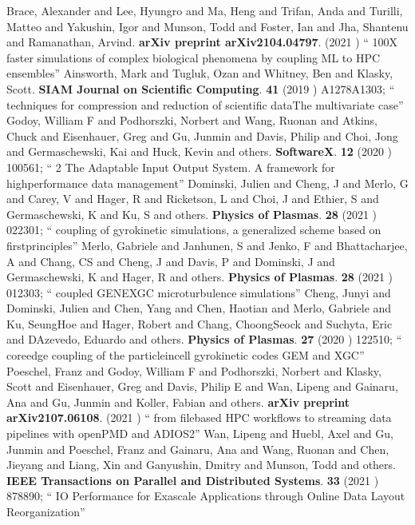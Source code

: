 \documentclass{article}
\begin{document}
\begin{thebibliography}{99}
 Brace, Alexander and Lee, Hyungro and Ma, Heng and Trifan, Anda and Turilli, Matteo and Yakushin, Igor and Munson, Todd and Foster, Ian and Jha, Shantenu and Ramanathan, Arvind. {\bf arXiv preprint arXiv2104.04797}. (2021 ) `` 100X faster simulations of complex biological phenomena by coupling ML to HPC ensembles''
 Ainsworth, Mark and Tugluk, Ozan and Whitney, Ben and Klasky, Scott. {\bf SIAM Journal on Scientific Computing}. {\bf 41} (2019 ) A1278A1303; `` techniques for compression and reduction of scientific dataThe multivariate case''
 Godoy, William F and Podhorszki, Norbert and Wang, Ruonan and Atkins, Chuck and Eisenhauer, Greg and Gu, Junmin and Davis, Philip and Choi, Jong and Germaschewski, Kai and Huck, Kevin and others. {\bf SoftwareX}. {\bf 12} (2020 ) 100561; `` 2 The Adaptable Input Output System. A framework for highperformance data management''
 Dominski, Julien and Cheng, J and Merlo, G and Carey, V and Hager, R and Ricketson, L and Choi, J and Ethier, S and Germaschewski, K and Ku, S and others. {\bf Physics of Plasmas}. {\bf 28} (2021 ) 022301; `` coupling of gyrokinetic simulations, a generalized scheme based on firstprinciples''
 Merlo, Gabriele and Janhunen, S and Jenko, F and Bhattacharjee, A and Chang, CS and Cheng, J and Davis, P and Dominski, J and Germaschewski, K and Hager, R and others. {\bf Physics of Plasmas}. {\bf 28} (2021 ) 012303; `` coupled GENEXGC microturbulence simulations''
 Cheng, Junyi and Dominski, Julien and Chen, Yang and Chen, Haotian and Merlo, Gabriele and Ku, SeungHoe and Hager, Robert and Chang, ChoongSeock and Suchyta, Eric and DAzevedo, Eduardo and others. {\bf Physics of Plasmas}. {\bf 27} (2020 ) 122510; `` coreedge coupling of the particleincell gyrokinetic codes GEM and XGC''
 Poeschel, Franz and Godoy, William F and Podhorszki, Norbert and Klasky, Scott and Eisenhauer, Greg and Davis, Philip E and Wan, Lipeng and Gainaru, Ana and Gu, Junmin and Koller, Fabian and others. {\bf arXiv preprint arXiv2107.06108}. (2021 ) `` from filebased HPC workflows to streaming data pipelines with openPMD and ADIOS2''
 Wan, Lipeng and Huebl, Axel and Gu, Junmin and Poeschel, Franz and Gainaru, Ana and Wang, Ruonan and Chen, Jieyang and Liang, Xin and Ganyushin, Dmitry and Munson, Todd and others. {\bf IEEE Transactions on Parallel and Distributed Systems}. {\bf 33} (2021 ) 878890; `` IO Performance for Exascale Applications through Online Data Layout Reorganization''

\end{thebibliography}
\end{document}
